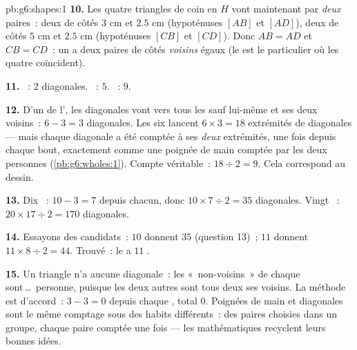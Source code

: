 \begin{solution}{pb:g6:shapes:1}
\textbf{10.} Les quatre triangles de coin en $H$ vont maintenant par
\emph{deux} paires~: deux de côtés $3$ cm et $2.5$ cm (hypoténuses
$[AB]$ et $[AD]$), deux de côtés $5$ cm et $2.5$ cm (hypoténuses
$[CB]$ et $[CD]$). Donc $AB = AD$ et $CB = CD$~: un  a
deux paires de côtés \emph{voisins} égaux (le  est le
 particulier où les quatre coïncident).

\textbf{11.} ~: $2$ diagonales. ~: $5$.
~: $9$.

\textbf{12.} D'un  de l', les diagonales vont vers
tous les  sauf lui-même et ses deux voisins~: $6 - 3 = 3$
diagonales. Les six  lancent $6 \times 3 = 18$ extrémités de
diagonales --- mais chaque diagonale a été comptée à ses \emph{deux}
extrémités, une fois depuis chaque bout, exactement comme une
poignée de main comptée par les deux personnes
(\cref{pb:g6:wholes:1}). Compte véritable~: $18 \div 2 = 9$. Cela
correspond au dessin.

\textbf{13.} Dix ~: $10 - 3 = 7$ depuis chacun, donc
$10 \times 7 \div 2 = 35$ diagonales. Vingt ~:
$20 \times 17 \div 2 = 170$ diagonales.

\textbf{14.} Essayons des candidats~: $10$  donnent $35$
(question 13)~; $11$  donnent $11 \times 8 \div 2 = 44$.
Trouvé~: le  a $11$ .

\textbf{15.} Un triangle n'a aucune diagonale~: les «~non-voisins~»
de chaque  sont\,\dots\ personne, puisque les deux autres
 sont tous deux ses voisins. La méthode est d'accord~:
$3 - 3 = 0$ depuis chaque , total $0$. Poignées de main et
diagonales sont le même comptage sous des habits différents~: des
paires choisies dans un groupe, chaque paire comptée une fois --- les
mathématiques recyclent leurs bonnes idées.
\end{solution}
